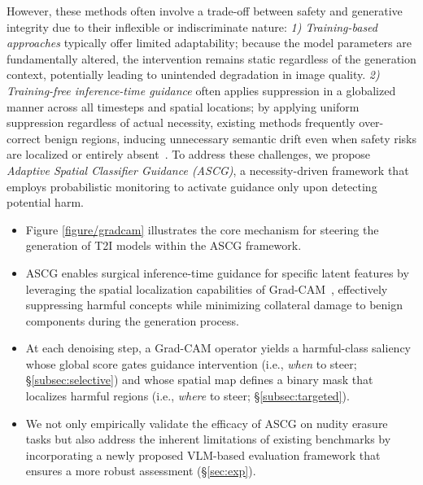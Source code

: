 However, these methods often involve a trade-off between safety and generative integrity due to their inflexible or indiscriminate nature: \emph{1) Training-based approaches} typically offer limited adaptability; because the model parameters are fundamentally altered, the intervention remains static regardless of the generation context, potentially leading to unintended degradation in image quality.
\emph{2) Training-free inference-time guidance} often applies suppression in a globalized manner across all timesteps and spatial locations; by applying uniform suppression regardless of actual necessity, existing methods frequently over-correct benign regions, inducing unnecessary semantic drift even when safety risks are localized or entirely absent~\citep{gandikota2023erasing,schramowski2023safe}.
To address these challenges, we propose \emph{Adaptive Spatial Classifier Guidance (ASCG)}, a necessity-driven framework that employs probabilistic monitoring to activate guidance only upon detecting potential harm.
\begin{itemize}
    \item Figure \ref{figure/gradcam} illustrates the core mechanism for steering the generation of T2I models within the ASCG framework.
    \item ASCG enables surgical inference-time guidance for specific latent features by leveraging the spatial localization capabilities of Grad-CAM~\citep{selvaraju2017grad}, effectively suppressing harmful concepts while minimizing collateral damage to benign components during the generation process.
    \item At each denoising step, a Grad-CAM operator yields a harmful-class saliency whose global score gates guidance intervention (i.e., \emph{when} to steer; \S\ref{subsec:selective}) and whose spatial map defines a binary mask that localizes harmful regions (i.e., \emph{where} to steer; \S\ref{subsec:targeted}).
    \item We not only empirically validate the efficacy of ASCG on nudity erasure tasks but also address the inherent limitations of existing benchmarks by incorporating a newly proposed VLM-based evaluation framework that ensures a more robust assessment (\S\ref{sec:exp}).
\end{itemize}


